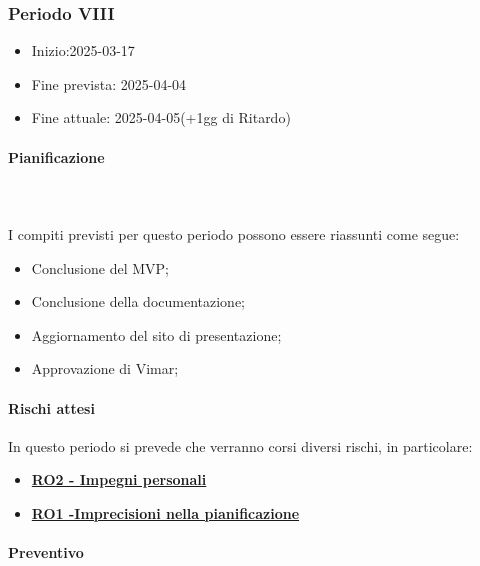 \subsubsection{Periodo VIII}

\begin{itemize}
    \item Inizio:2025-03-17 
    \item Fine prevista: 2025-04-04
    \item Fine attuale: 2025-04-05(+1gg di Ritardo)
\end{itemize}
\paragraph{Pianificazione} \hspace{1cm}
\\ \hspace{1cm} \\

I compiti previsti per questo periodo possono essere riassunti come segue:  
\begin{itemize}
    \item Conclusione del MVP;
    \item Conclusione della documentazione;
    \item Aggiornamento del sito di presentazione;
    \item Approvazione di Vimar;
    
\end{itemize}

\paragraph{Rischi attesi}  
In questo periodo si prevede che verranno corsi diversi rischi, in particolare:
\begin{itemize}
    \item \textbf{\hyperlink{RO2}{RO2 - Impegni personali  }}
    \item \textbf{\hyperlink{RO1}{RO1 -Imprecisioni nella pianificazione}}

   
\end{itemize}

\paragraph{Preventivo} \hspace{1cm} 

